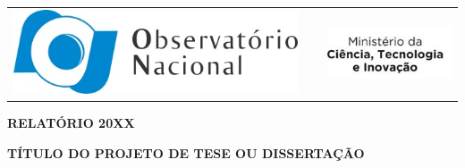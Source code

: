\documentclass[12pt,a4paper]{article}
\begin{document}
\begin{tabular}{lcr}
    \includegraphics{img/logo-on.jpg}
    & \hspace{5cm} &
    \includegraphics{img/logo-mcti.png}
\end{tabular}

\vspace{0.5cm}

\begin{center}
    \textbf{\LARGE RELATÓRIO 20XX}

    \vspace{1cm}

    \textbf{TÍTULO DO PROJETO DE TESE OU DISSERTAÇÃO}
\end{center}

\vspace{1.5cm}
\end{document}
